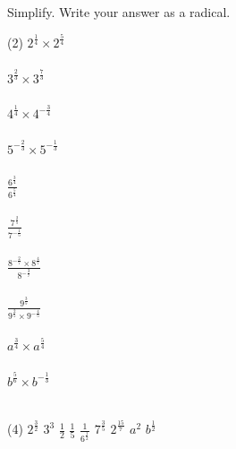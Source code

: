 \documentclass[12pt,fleqn]{book}
\newcommand{\prb}[1]{\begin{Exercise}#1\end{Exercise}}
\newcommand{\sol}[1]{\begin{Answer}#1\end{Answer}}
\begin{document}
\clearpage
\prb{Simplify. Write your answer as a radical.\\
    \begin{tasks}(2)
        \task $\displaystyle 2^{\frac{1}{4}} \times 2^{\frac{5}{4}}$\\
        \\[1in]
        \task $\displaystyle 3^{\frac{2}{3}} \times 3^{\frac{7}{3}}$\\
        \\[1in]
        \task $\displaystyle 4^{\frac{1}{4}} \times 4^{-\frac{3}{4}}$\\
        \\[1in]
        \task $\displaystyle 5^{-\frac{2}{3}} \times 5^{-\frac{1}{3}}$\\
        \\[1in]
        \task $\displaystyle \frac{6^{\frac{3}{4}}}{6^{\frac{5}{4}}}$\\
        \\[1in]
        \task $\displaystyle \frac{7^{\frac{2}{5}}}{7^{-\frac{1}{5}}}$\\
        \\[1in]
        \task $\displaystyle \frac{8^{-\frac{2}{7}} \times 8^{\frac{4}{7}}}{8^{-\frac{3}{7}}}$\\
        \\[1in]
        \task $\displaystyle \frac{9^{\frac{3}{5}}}{9^{\frac{2}{5}} \times 9^{-\frac{4}{5}}}$\\
        \\[1in]
        \task $\displaystyle a^{\frac{3}{4}} \times a^{\frac{5}{4}}$\\
        \\[1in]
        \task $\displaystyle b^{\frac{5}{6}} \times b^{-\frac{1}{3}}$\\
        \\[1in]
    \end{tasks}
}
\sol{
    \begin{tasks}(4)
\task $2^{\frac{3}{2}}$
\task $3^3$
\task $\frac{1}{2}$
\task $\frac{1}{5}$
\task $\frac{1}{6^{\frac{1}{2}}}$
\task $7^{\frac{3}{5}}$
\task $2^{\frac{15}{7}}$
\task 9
\task $a^2$
\task $b^{\frac{1}{2}}$
\end{tasks}
}
\end{document}
